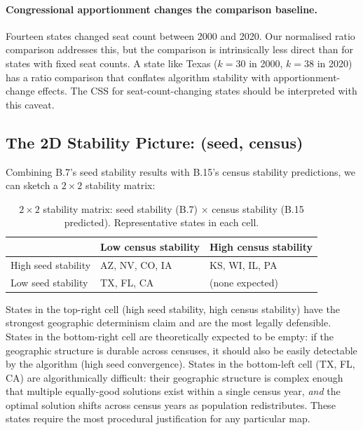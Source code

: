\paragraph{Congressional apportionment changes the comparison baseline.}
Fourteen states changed seat count between 2000 and 2020.
Our normalised ratio comparison addresses this, but the comparison is
intrinsically less direct than for states with fixed seat counts.
A state like Texas ($k=30$ in 2000, $k=38$ in 2020) has a ratio comparison
that conflates algorithm stability with apportionment-change effects.
The CSS for seat-count-changing states should be interpreted with this caveat.

\subsection{The 2D Stability Picture: (seed, census)}

Combining B.7's seed stability results with B.15's census stability predictions,
we can sketch a $2\times 2$ stability matrix:

\begin{table}[h]
\centering
\caption{$2\times 2$ stability matrix: seed stability (B.7) $\times$ census
  stability (B.15 predicted). Representative states in each cell.}
\label{tab:2d-stability}
\begin{tabular}{l l l}
\toprule
                  & Low census stability & High census stability \\
\midrule
High seed stability & AZ, NV, CO, IA      & KS, WI, IL, PA \\
Low seed stability  & TX, FL, CA         & (none expected) \\
\bottomrule
\end{tabular}
\end{table}

States in the top-right cell (high seed stability, high census stability)
have the strongest geographic determinism claim and are the most legally
defensible.
States in the bottom-right cell are theoretically expected to be empty:
if the geographic structure is durable across censuses, it should also be
easily detectable by the algorithm (high seed convergence).
States in the bottom-left cell (TX, FL, CA) are algorithmically difficult:
their geographic structure is complex enough that multiple equally-good
solutions exist within a single census year, \emph{and} the optimal solution
shifts across census years as population redistributes.
These states require the most procedural justification for any particular map.

